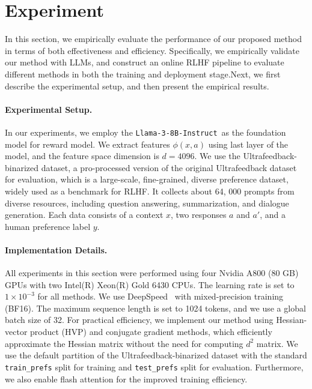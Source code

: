 \section{Experiment}
\label{sec:experiment}

In this section, we empirically evaluate the performance of our proposed method in terms of both effectiveness and efficiency. Specifically, we empirically validate our method with LLMs, and construct an online RLHF pipeline to evaluate different methods in both the training and deployment stage.\footnotemark[1] Next, we first describe the experimental setup, and then present the empirical results.

\paragraph{Experimental Setup.} In our experiments, we employ the \texttt{Llama-3-8B-Instruct}~\footnotemark[2] as the foundation model for reward model. We extract features $\phi(x,a)$ using last layer of the model, and the feature space dimension is $d=4096$. We use the {Ultrafeedback-binarized dataset}, a pro-processed version of the original Ultrafeedback dataset~\citep{arXiv'23:Ultrafeedback} for evaluation, which is a large-scale, fine-grained, diverse preference dataset, widely used as a benchmark for RLHF. It collects about 64, 000 prompts from diverse resources, including question answering, summarization, and dialogue generation. Each data consists of a context $x$, two responses $a$ and $a'$, and a human preference label $y$. 


\paragraph{Implementation Details.} All experiments in this section were performed using four Nvidia A800 (80 GB) GPUs with two Intel(R) Xeon(R) Gold 6430 CPUs. The learning rate is set to $1\times 10^{-3}$ for all methods. We use DeepSpeed~\citep{KDD'20:DeepSpeed} with mixed-precision training (BF16). The maximum sequence length is set to 1024 tokens, and we use a global batch size of 32. For practical efficiency, we implement our method using Hessian-vector product (HVP) and conjugate gradient methods, which efficiently approximate the Hessian matrix without the need for computing $d^2$ matrix. We use the default partition of the Ultrafeedback-binarized dataset with the standard \texttt{train\_prefs} split for training and \texttt{test\_prefs} split for evaluation. Furthermore, we also enable flash attention for the improved training efficiency.


